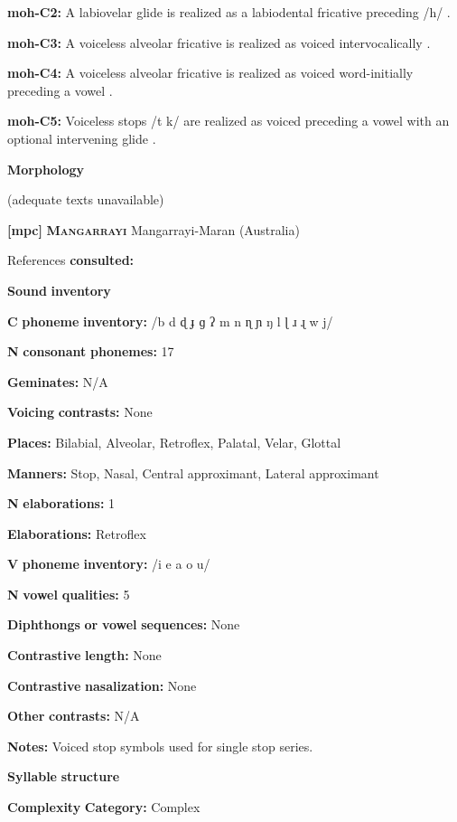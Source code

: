 \begin{styleBody}
\textbf{moh-C2:} A labiovelar glide is realized as a labiodental fricative preceding /h/ \citep[34]{Bonvillain1973}.

\textbf{moh-C3:} A voiceless alveolar fricative is realized as voiced intervocalically \citep{Bonvillain1973}.

\textbf{moh-C4:} A voiceless alveolar fricative is realized as voiced word-initially preceding a vowel \citep{Bonvillain1973}.

\textbf{moh-C5:} Voiceless stops /t k/ are realized as voiced preceding a vowel with an optional intervening glide \citep[28]{Bonvillain1973}.

\textbf{Morphology}

(adequate texts unavailable)

\textbf{[mpc]}   \textbf{\textsc{Mangarrayi}  }  Mangarrayi-Maran (Australia)

References \textbf{consulted:} \citet{Merlan1989}

\textbf{Sound} \textbf{inventory}

\textbf{C} \textbf{phoneme} \textbf{inventory:} /b d ɖ ɟ ɡ ʔ m n ɳ ɲ ŋ l ɭ ɹ ɻ w j/

\textbf{N} \textbf{consonant} \textbf{phonemes:} 17

\textbf{Geminates:} N/A

\textbf{Voicing} \textbf{contrasts:} None

\textbf{Places:} Bilabial, Alveolar, Retroflex, Palatal, Velar, Glottal

\textbf{Manners:} Stop, Nasal, Central approximant, Lateral approximant

\textbf{N} \textbf{elaborations:} 1

\textbf{Elaborations:} Retroflex

\textbf{V} \textbf{phoneme} \textbf{inventory:} /i e a o u/

\textbf{N} \textbf{vowel} \textbf{qualities:} 5

\textbf{Diphthongs} \textbf{or} \textbf{vowel} \textbf{sequences:} None

\textbf{Contrastive} \textbf{length:} None

\textbf{Contrastive} \textbf{nasalization:} None

\textbf{Other} \textbf{contrasts:} N/A

\textbf{Notes:} Voiced stop symbols used for single stop series.

\textbf{Syllable} \textbf{structure}

\textbf{Complexity} \textbf{Category:} Complex


\end{styleBody}
